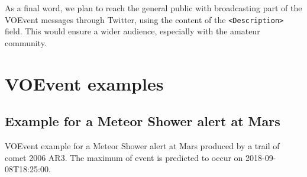 \documentclass[referee,a4paper,12pt,traditabstract]{swsc}
\begin{document}
\begin{linenumbers}
As a final word, we plan to reach the general public with broadcasting part of the VOEvent messages through Twitter, using the content of the {\tt <Description>} field. This would ensure a wider audience, especially with the amateur community.




\appendix

\section{VOEvent examples}

\subsection{Example for a Meteor Shower alert at Mars}
\label{appendix-xml-voevent-meteor}

VOEvent example for a Meteor Shower alert at Mars produced by a trail of comet 2006 AR3. The maximum of event is predicted to occur on 2018-09-08T18:25:00.


\end{linenumbers}
\end{document}
